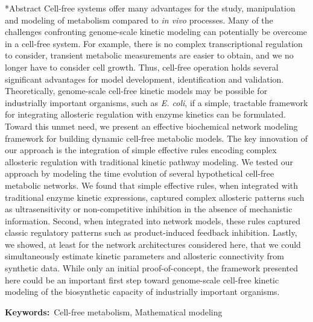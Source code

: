 \documentclass[12pt]{article}
\makeatletter
\renewcommand\section{\@startsection
	{subsection}{2}{0mm}
	{-0.2in}
	{0.05\baselineskip}
	{\normalfont\large\bfseries}}
\makeatother
\begin{document}
\section*{Abstract}
Cell-free systems offer many advantages for the study, manipulation and modeling of metabolism compared to \textit{in vivo} processes.
Many of the challenges confronting genome-scale kinetic modeling can potentially be overcome in a cell-free system. 
For example, there is no complex transcriptional regulation to consider, transient metabolic measurements are easier to obtain, and we no longer have to consider cell growth. 
Thus, cell-free operation holds several significant advantages for model development, identification and validation. 
Theoretically, genome-scale cell-free kinetic models may be possible for industrially important organisms, such as \textit{E. coli}, if a simple, tractable framework for integrating allosteric regulation with enzyme kinetics can be formulated. 
Toward this unmet need, we present an effective biochemical network modeling framework for building dynamic cell-free metabolic models.
The key innovation of our approach is the integration of simple effective rules encoding complex allosteric regulation with traditional kinetic pathway modeling. 
We tested our approach by modeling the time evolution of several hypothetical cell-free metabolic networks. 
We found that simple effective rules, when integrated with traditional enzyme kinetic expressions, captured complex allosteric patterns such as ultrasensitivity or non-competitive inhibition in the absence of mechanistic information. 
Second, when integrated into network models, these rules captured classic regulatory patterns such as product-induced feedback inhibition. 
Lastly, we showed, at least for the network architectures considered here, that we could simultaneously estimate kinetic parameters and allosteric connectivity from synthetic data. 
While only an initial proof-of-concept, the framework presented here could be an important first step toward genome-scale cell-free kinetic modeling of the biosynthetic capacity of industrially important organisms.

{\noindent \textbf{Keywords:}~Cell-free metabolism, Mathematical modeling}

\pagebreak

\setcounter{page}{1}

\linenumbers
\end{document}
